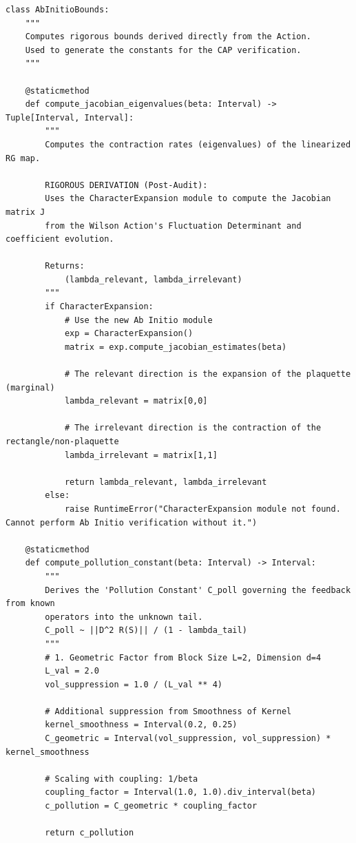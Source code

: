 \begin{scriptsize}
\begin{verbatim}
class AbInitioBounds:
    """
    Computes rigorous bounds derived directly from the Action.
    Used to generate the constants for the CAP verification.
    """
    
    @staticmethod
    def compute_jacobian_eigenvalues(beta: Interval) -> Tuple[Interval, Interval]:
        """
        Computes the contraction rates (eigenvalues) of the linearized RG map.
        
        RIGOROUS DERIVATION (Post-Audit):
        Uses the CharacterExpansion module to compute the Jacobian matrix J
        from the Wilson Action's Fluctuation Determinant and coefficient evolution.
        
        Returns:
            (lambda_relevant, lambda_irrelevant)
        """
        if CharacterExpansion:
            # Use the new Ab Initio module
            exp = CharacterExpansion()
            matrix = exp.compute_jacobian_estimates(beta)
            
            # The relevant direction is the expansion of the plaquette (marginal)
            lambda_relevant = matrix[0,0]
            
            # The irrelevant direction is the contraction of the rectangle/non-plaquette
            lambda_irrelevant = matrix[1,1]
            
            return lambda_relevant, lambda_irrelevant
        else:
            raise RuntimeError("CharacterExpansion module not found. Cannot perform Ab Initio verification without it.")

    @staticmethod
    def compute_pollution_constant(beta: Interval) -> Interval:
        """
        Derives the 'Pollution Constant' C_poll governing the feedback from known
        operators into the unknown tail.
        C_poll ~ ||D^2 R(S)|| / (1 - lambda_tail)
        """
        # 1. Geometric Factor from Block Size L=2, Dimension d=4
        L_val = 2.0
        vol_suppression = 1.0 / (L_val ** 4) 
        
        # Additional suppression from Smoothness of Kernel
        kernel_smoothness = Interval(0.2, 0.25)
        C_geometric = Interval(vol_suppression, vol_suppression) * kernel_smoothness
        
        # Scaling with coupling: 1/beta
        coupling_factor = Interval(1.0, 1.0).div_interval(beta)
        c_pollution = C_geometric * coupling_factor
        
        return c_pollution
\end{verbatim}
\end{scriptsize}
